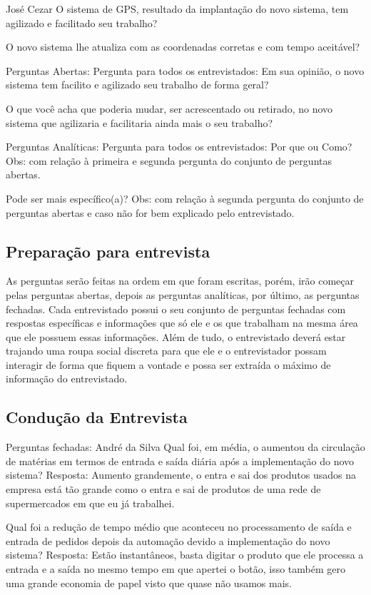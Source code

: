 José Cezar
O sistema de GPS, resultado da implantação do novo sistema, tem agilizado e facilitado seu trabalho?

O novo sistema lhe atualiza com as coordenadas corretas e com tempo aceitável?

Perguntas Abertas:
Pergunta para todos os entrevistados:
Em sua opinião, o novo sistema tem facilito e agilizado seu trabalho de forma geral?

O que você acha que poderia mudar, ser acrescentado ou retirado, no novo sistema que agilizaria e facilitaria ainda mais o seu trabalho?

Perguntas Analíticas:
Pergunta para todos os entrevistados:
Por que ou Como?
Obs: com relação à primeira e segunda pergunta do conjunto de perguntas abertas.



Pode ser mais específico(a)?
Obs: com relação à segunda pergunta do conjunto de perguntas abertas e caso não for bem explicado pelo entrevistado.

\subsection{Preparação para entrevista}
As perguntas serão feitas na ordem em que foram escritas, porém, irão começar pelas perguntas abertas, depois as perguntas analíticas, por último, as perguntas fechadas. Cada entrevistado possui o seu conjunto de perguntas fechadas com respostas específicas e informações que só ele e os que trabalham na mesma área que ele possuem essas informações. Além de tudo, o entrevistado deverá estar trajando uma roupa social discreta para que ele e o entrevistador possam interagir de forma que fiquem a vontade e possa ser extraída o máximo de informação do entrevistado.
\subsection{Condução da Entrevista}
 Perguntas fechadas:
André da Silva
Qual foi, em média, o aumentou da circulação de matérias em termos de entrada e saída diária após a implementação do novo sistema? 
Resposta: Aumento grandemente, o entra e sai dos produtos usados na empresa está tão grande como o entra e sai de produtos de uma rede de supermercados em que eu já trabalhei.

Qual foi a redução de tempo médio que aconteceu no processamento de saída e entrada de pedidos depois da automação devido a implementação do novo sistema?
Resposta: Estão instantâneos, basta digitar o produto que ele processa a entrada e a saída no mesmo tempo em que apertei o botão, isso também gero uma grande economia de papel visto que quase não usamos mais.

